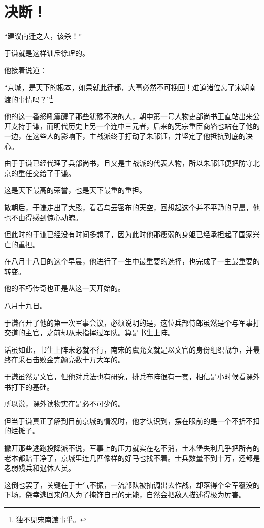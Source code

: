 \section{决断！}
\ifnum{}
	\begin{multicols}{\theparacolNo}
\fi
“建议南迁之人，该杀！”

于谦就是这样训斥徐珵的。

他接着说道：

“京城，是天下的根本，如果就此迁都，大事必然不可挽回！难道诸位忘了宋朝南渡的事情吗？”\footnote{独不见宋南渡事乎。}

他的这一番怒吼震醒了那些犹豫不决的人，朝中第一号人物吏部尚书王直站出来公开支持于谦，而明代历史上另一个连中三元者，后来的宪宗重臣商辂也站在了他的一边，在这些人的影响下，主战派终于打动了朱祁钰，并坚定了他抵抗到底的决心。

由于于谦已经代理了兵部尚书，且又是主战派的代表人物，所以朱祁钰便把防守北京的重任交给了于谦。

这是天下最高的荣誉，也是天下最重的重担。

散朝后，于谦走出了大殿，看着乌云密布的天空，回想起这个并不平静的早晨，他也不由得感到惊心动魄。

但此时的于谦已经没有时间多想了，因为此时他那瘦弱的身躯已经承担起了国家兴亡的重担。

在八月十八日的这个早晨，他进行了一生中最重要的选择，也完成了一生最重要的转变。

他的不朽传奇也正是从这一天开始的。

八月十九日。

于谦召开了他的第一次军事会议，必须说明的是，这位兵部侍郎虽然是个与军事打交道的主官，之前却从未指挥过军队。算是书生上阵。

话虽如此，书生上阵未必就不行，南宋的虞允文就是以文官的身份组织战争，并最终在采石击败金完颜亮数十万大军的。

于谦虽然是文官，但他对兵法也有研究，排兵布阵很有一套，相信是小时候看课外书打下的基础。

所以说，课外读物实在是必不可少的。

但当于谦真正了解到目前京城的情况时，他才认识到，摆在眼前的是一个不折不扣的烂摊子。

撇开那些逃跑投降派不说，军事上的压力就实在吃不消，土木堡失利几乎把所有的老本都赔干净了，京城里连几匹像样的好马也找不着。士兵数量不到十万，还都是老弱残兵和退休人员。

这倒也罢了，关键在于士气不振，一流部队被抽调出去作战，却落得个全军覆没的下场，侥幸逃回来的人为了掩饰自己的无能，自然会把敌人描述得极为厉害。


\end{multicols}
